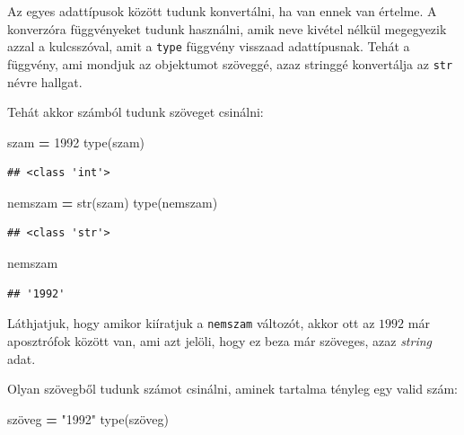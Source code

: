 \documentclass[
]{book}
\newenvironment{Shaded}{\begin{snugshade}}{\end{snugshade}}
\newcommand{\BuiltInTok}[1]{#1}
\newcommand{\DecValTok}[1]{\textcolor[rgb]{0.00,0.00,0.81}{#1}}
\newcommand{\NormalTok}[1]{#1}
\newcommand{\OperatorTok}[1]{\textcolor[rgb]{0.81,0.36,0.00}{\textbf{#1}}}
\newcommand{\StringTok}[1]{\textcolor[rgb]{0.31,0.60,0.02}{#1}}
\begin{document}
Az egyes adattípusok között tudunk konvertálni, ha van ennek van értelme. A konverzóra függvényeket tudunk használni, amik neve kivétel nélkül megegyezik azzal a kulcsszóval, amit a \texttt{type} függvény visszaad adattípusnak. Tehát a függvény, ami mondjuk az objektumot szöveggé, azaz stringgé konvertálja az \texttt{str} névre hallgat.

Tehát akkor számból tudunk szöveget csinálni:

\begin{Shaded}
\begin{Highlighting}[]
\NormalTok{szam }\OperatorTok{=} \DecValTok{1992}
\BuiltInTok{type}\NormalTok{(szam)}
\end{Highlighting}
\end{Shaded}

\begin{verbatim}
## <class 'int'>
\end{verbatim}

\begin{Shaded}
\begin{Highlighting}[]
\NormalTok{nemszam }\OperatorTok{=} \BuiltInTok{str}\NormalTok{(szam)}
\BuiltInTok{type}\NormalTok{(nemszam)}
\end{Highlighting}
\end{Shaded}

\begin{verbatim}
## <class 'str'>
\end{verbatim}

\begin{Shaded}
\begin{Highlighting}[]
\NormalTok{nemszam}
\end{Highlighting}
\end{Shaded}

\begin{verbatim}
## '1992'
\end{verbatim}

Láthjatjuk, hogy amikor kiíratjuk a \texttt{nemszam} változót, akkor ott az \(1992\) már aposztrófok között van, ami azt jelöli, hogy ez beza már szöveges, azaz \emph{string} adat.

Olyan szövegből tudunk számot csinálni, aminek tartalma tényleg egy valid szám:

\begin{Shaded}
\begin{Highlighting}[]
\NormalTok{szöveg }\OperatorTok{=} \StringTok{"1992"}
\BuiltInTok{type}\NormalTok{(szöveg)}
\end{Highlighting}
\end{Shaded}
\end{document}
